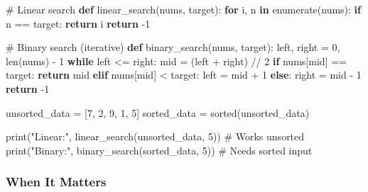 \documentclass[
  letterpaper,
  DIV=11,
  numbers=noendperiod]{scrreprt}
\newenvironment{Shaded}{\begin{snugshade}}{\end{snugshade}}
\newcommand{\BuiltInTok}[1]{\textcolor[rgb]{0.00,0.23,0.31}{#1}}
\newcommand{\CommentTok}[1]{\textcolor[rgb]{0.37,0.37,0.37}{#1}}
\newcommand{\ControlFlowTok}[1]{\textcolor[rgb]{0.00,0.23,0.31}{\textbf{#1}}}
\newcommand{\DecValTok}[1]{\textcolor[rgb]{0.68,0.00,0.00}{#1}}
\newcommand{\KeywordTok}[1]{\textcolor[rgb]{0.00,0.23,0.31}{\textbf{#1}}}
\newcommand{\NormalTok}[1]{\textcolor[rgb]{0.00,0.23,0.31}{#1}}
\newcommand{\OperatorTok}[1]{\textcolor[rgb]{0.37,0.37,0.37}{#1}}
\newcommand{\StringTok}[1]{\textcolor[rgb]{0.13,0.47,0.30}{#1}}
\begin{document}
\begin{Shaded}
\begin{Highlighting}[]
\CommentTok{\# Linear search}
\KeywordTok{def}\NormalTok{ linear\_search(nums, target):}
    \ControlFlowTok{for}\NormalTok{ i, n }\KeywordTok{in} \BuiltInTok{enumerate}\NormalTok{(nums):}
        \ControlFlowTok{if}\NormalTok{ n }\OperatorTok{==}\NormalTok{ target:}
            \ControlFlowTok{return}\NormalTok{ i}
    \ControlFlowTok{return} \OperatorTok{{-}}\DecValTok{1}

\CommentTok{\# Binary search (iterative)}
\KeywordTok{def}\NormalTok{ binary\_search(nums, target):}
\NormalTok{    left, right }\OperatorTok{=} \DecValTok{0}\NormalTok{, }\BuiltInTok{len}\NormalTok{(nums) }\OperatorTok{{-}} \DecValTok{1}
    \ControlFlowTok{while}\NormalTok{ left }\OperatorTok{\textless{}=}\NormalTok{ right:}
\NormalTok{        mid }\OperatorTok{=}\NormalTok{ (left }\OperatorTok{+}\NormalTok{ right) }\OperatorTok{//} \DecValTok{2}
        \ControlFlowTok{if}\NormalTok{ nums[mid] }\OperatorTok{==}\NormalTok{ target:}
            \ControlFlowTok{return}\NormalTok{ mid}
        \ControlFlowTok{elif}\NormalTok{ nums[mid] }\OperatorTok{\textless{}}\NormalTok{ target:}
\NormalTok{            left }\OperatorTok{=}\NormalTok{ mid }\OperatorTok{+} \DecValTok{1}
        \ControlFlowTok{else}\NormalTok{:}
\NormalTok{            right }\OperatorTok{=}\NormalTok{ mid }\OperatorTok{{-}} \DecValTok{1}
    \ControlFlowTok{return} \OperatorTok{{-}}\DecValTok{1}

\NormalTok{unsorted\_data }\OperatorTok{=}\NormalTok{ [}\DecValTok{7}\NormalTok{, }\DecValTok{2}\NormalTok{, }\DecValTok{9}\NormalTok{, }\DecValTok{1}\NormalTok{, }\DecValTok{5}\NormalTok{]}
\NormalTok{sorted\_data }\OperatorTok{=} \BuiltInTok{sorted}\NormalTok{(unsorted\_data)}

\BuiltInTok{print}\NormalTok{(}\StringTok{"Linear:"}\NormalTok{, linear\_search(unsorted\_data, }\DecValTok{5}\NormalTok{))  }\CommentTok{\# Works unsorted}
\BuiltInTok{print}\NormalTok{(}\StringTok{"Binary:"}\NormalTok{, binary\_search(sorted\_data, }\DecValTok{5}\NormalTok{))    }\CommentTok{\# Needs sorted input}
\end{Highlighting}
\end{Shaded}

\subsubsection{When It Matters}\label{when-it-matters-76}
\end{document}
